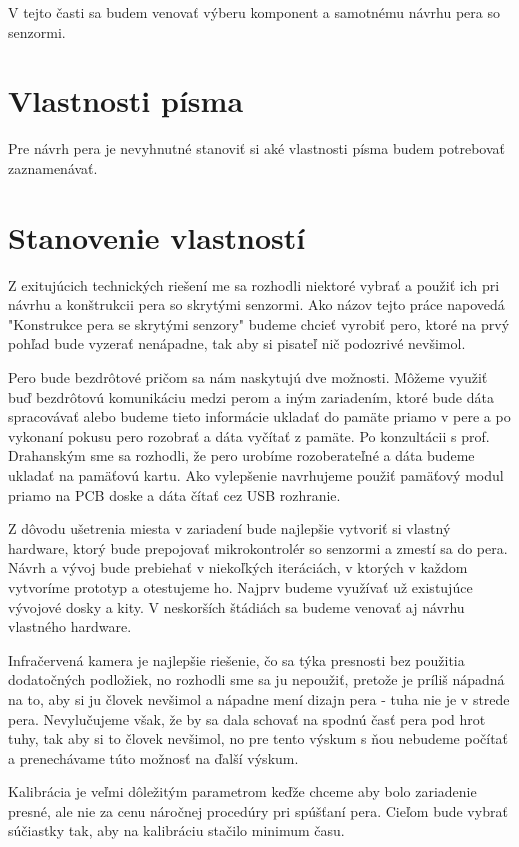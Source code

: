V tejto časti sa budem venovať výberu komponent a samotnému návrhu pera so senzormi.

\section{Vlastnosti písma}

Pre návrh pera je nevyhnutné stanoviť si aké vlastnosti písma budem potrebovať zaznamenávať. 

\section{Stanovenie vlastností}

Z exitujúcich technických riešení me sa rozhodli niektoré vybrať a použiť ich pri návrhu a konštrukcii pera so skrytými senzormi. Ako názov tejto práce napovedá "Konstrukce pera se skrytými senzory" budeme chcieť vyrobiť pero, ktoré na prvý pohľad bude vyzerať nenápadne, tak aby si pisateľ nič podozrivé nevšimol. 

Pero bude bezdrôtové pričom sa nám naskytujú dve možnosti. Môžeme využiť buď bezdrôtovú komunikáciu medzi perom a iným zariadením, ktoré bude dáta spracovávať alebo budeme tieto informácie ukladať do pamäte priamo v pere a po vykonaní pokusu pero rozobrať a dáta vyčítať z pamäte. Po konzultácii s prof. Drahanským sme sa rozhodli, že pero urobíme rozoberateľné a dáta budeme ukladať na pamäťovú kartu. Ako vylepšenie navrhujeme použiť pamäťový modul priamo na PCB doske a dáta čítať cez USB rozhranie.

Z dôvodu ušetrenia miesta v zariadení bude najlepšie vytvoriť si vlastný hardware, ktorý bude prepojovať mikrokontrolér so senzormi a zmestí sa do pera. Návrh a vývoj bude prebiehať v niekoľkých iteráciách, v ktorých v každom vytvoríme prototyp a otestujeme ho. Najprv budeme využívať už existujúce vývojové dosky a kity. V neskorších štádiách sa budeme venovať aj návrhu vlastného hardware. 

Infračervená kamera je najlepšie riešenie, čo sa týka presnosti bez použitia dodatočných podložiek, no rozhodli sme sa ju nepoužiť, pretože je príliš nápadná na to, aby si ju človek nevšimol a nápadne mení dizajn pera - tuha nie je v strede pera. Nevylučujeme však, že by sa dala schovať na spodnú časť pera pod hrot tuhy, tak aby si to človek nevšimol, no pre tento výskum s ňou nebudeme počítať a prenechávame túto možnosť na ďalší výskum.

Kalibrácia je veľmi dôležitým parametrom keďže chceme aby bolo zariadenie presné, ale nie za cenu náročnej procedúry pri spúšťaní pera. Cieľom bude vybrať súčiastky tak, aby na kalibráciu stačilo minimum času. 

